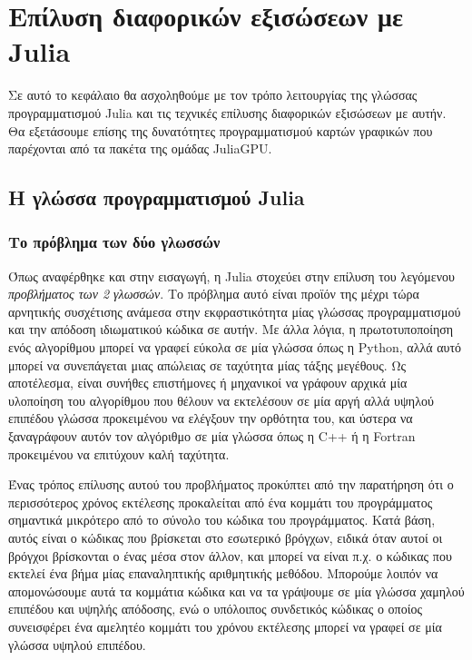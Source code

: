 \chapter{Επίλυση διαφορικών εξισώσεων με Julia}

Σε αυτό το κεφάλαιο θα ασχοληθούμε με τον τρόπο λειτουργίας της γλώσσας προγραμματισμού Julia και τις τεχνικές επίλυσης διαφορικών εξισώσεων με αυτήν.
Θα εξετάσουμε επίσης της δυνατότητες προγραμματισμού καρτών γραφικών που παρέχονται από τα πακέτα της ομάδας JuliaGPU.

\section{Η γλώσσα προγραμματισμού Julia}

\subsection{Το πρόβλημα των δύο γλωσσών}

Όπως αναφέρθηκε και στην εισαγωγή, η Julia στοχεύει στην επίλυση του λεγόμενου \emph{προβλήματος των 2 γλωσσών}.
Το πρόβλημα αυτό είναι προϊόν της μέχρι τώρα αρνητικής συσχέτισης ανάμεσα στην εκφραστικότητα μίας γλώσσας προγραμματισμού και την απόδοση ιδιωματικού κώδικα σε αυτήν.
Με άλλα λόγια, η πρωτοτυποποίηση ενός αλγορίθμου μπορεί να γραφεί εύκολα σε μία γλώσσα όπως η Python, αλλά αυτό μπορεί να συνεπάγεται μιας απώλειας σε ταχύτητα μίας τάξης μεγέθους.
Ως αποτέλεσμα, είναι συνήθες επιστήμονες ή μηχανικοί να γράφουν αρχικά μία υλοποίηση του αλγορίθμου που θέλουν να εκτελέσουν σε μία αργή αλλά υψηλού επιπέδου γλώσσα προκειμένου να ελέγξουν την ορθότητα του, και ύστερα να ξαναγράφουν αυτόν τον αλγόριθμο σε μία γλώσσα όπως η C++ ή η Fortran προκειμένου να επιτύχουν καλή ταχύτητα.

Ένας τρόπος επίλυσης αυτού του προβλήματος προκύπτει από την παρατήρηση ότι ο περισσότερος χρόνος εκτέλεσης προκαλείται από ένα κομμάτι του προγράμματος σημαντικά μικρότερο από το σύνολο του κώδικα του προγράμματος.
Κατά βάση, αυτός είναι ο κώδικας που βρίσκεται στο εσωτερικό βρόγχων, ειδικά όταν αυτοί οι βρόγχοι βρίσκονται ο ένας μέσα στον άλλον, και μπορεί να είναι π.χ. ο κώδικας που εκτελεί ένα βήμα μίας επαναληπτικής αριθμητικής μεθόδου.
Μπορούμε λοιπόν να απομονώσουμε αυτά τα κομμάτια κώδικα και να τα γράψουμε σε μία γλώσσα χαμηλού επιπέδου και υψηλής απόδοσης, ενώ ο υπόλοιπος συνδετικός κώδικας ο οποίος συνεισφέρει ένα αμελητέο κομμάτι του χρόνου εκτέλεσης μπορεί να γραφεί σε μία γλώσσα υψηλού επιπέδου.

